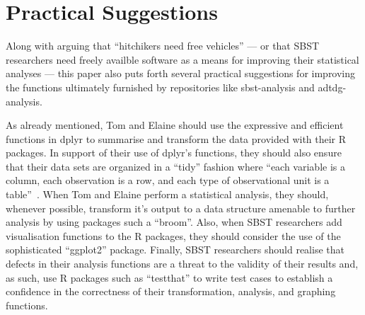 
\vspace*{-.5em}

\section{Practical Suggestions}
\label{sec:suggestions}


Along with arguing that ``hitchikers need free vehicles'' --- or that SBST researchers need freely availble software as
a means for improving their statistical analyses --- this paper also puts forth several practical suggestions for
improving the functions ultimately furnished by repositories like sbst-analysis and adtdg-analysis.

As already mentioned, Tom and Elaine should use the expressive and efficient functions in dplyr to summarise and
transform the data provided with their R packages. In support of their use of dplyr's functions, they should also ensure
that their data sets are organized in a ``tidy'' fashion where ``each variable is a column, each observation is a row,
and each type of observational unit is a table''~\cite{Wickham2014}. When Tom and Elaine perform a statistical analysis,
they should, whenever possible, transform it's output to a data structure amenable to further analysis by using packages
such a ``broom''. Also, when SBST researchers add visualisation functions to the R packages, they should consider the
use of the sophisticated ``ggplot2'' package. Finally, SBST researchers should realise that defects in their analysis
functions are a threat to the validity of their results and, as such, use R packages such as ``testthat'' to write test
cases to establish a confidence in the correctness of their transformation, analysis, and graphing functions.


